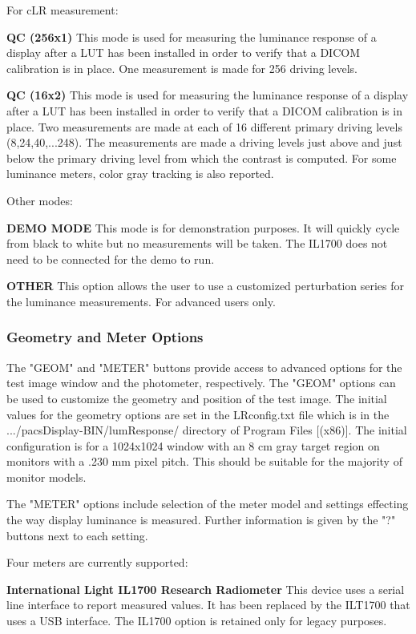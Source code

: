For cLR measurement: 

\textbf{QC (256x1)} This mode is used for measuring the luminance response of a display after a LUT has been installed in order to verify that a DICOM calibration is in place. One measurement is made for 256 driving levels. 

\textbf{QC (16x2)} This mode is used for measuring the luminance response of a display after a LUT has been installed in order to verify that a DICOM calibration is in place. Two measurements are made at each of 16 different primary driving levels (8,24,40,...248). The measurements are made a driving levels just above and just below the primary driving level from which the contrast is computed. For some luminance meters, color gray tracking is also reported. 

Other modes: 

\textbf{DEMO MODE} This mode is for demonstration purposes. It will quickly cycle from black to white but no measurements will be taken. The IL1700 does not need to be connected for the demo to run. 

\textbf{OTHER} This option allows the user to use a customized perturbation series for the luminance measurements. For advanced users only. 

\subsubsection{Geometry and Meter Options}

The "GEOM" and "METER" buttons provide access to advanced options for the test image window and the photometer, respectively. The "GEOM" options can be used to customize the geometry and position of the test image. The initial values for the geometry options are set in the LRconfig.txt file which is in the \textnormal{.../pacsDisplay-BIN/lumResponse/} directory of Program Files [(x86)]. The initial configuration is for a 1024x1024 window with an 8 cm gray target region on monitors with a .230 mm pixel pitch. This should be suitable for the majority of monitor models. 

The "METER" options include selection of the meter model and settings effecting the way display luminance is measured. Further information is given by the "?" buttons next to each setting. 

Four meters are currently supported: 

\textbf{International Light IL1700 Research Radiometer} This device uses a serial line interface to report measured values. It has been replaced by the ILT1700 that uses a USB interface. The IL1700 option is retained only for legacy purposes. 

